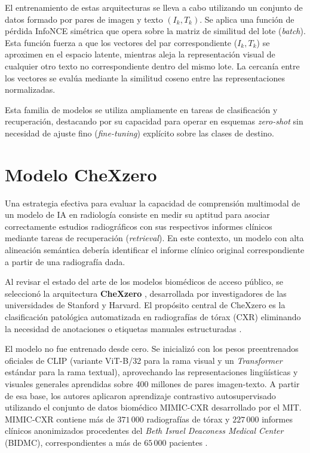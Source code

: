 \documentclass[../tesis.tex]{subfiles}
\begin{document}
El entrenamiento de estas arquitecturas se lleva a cabo utilizando un conjunto de datos formado por pares de imagen y texto $(I_k, T_k)$. Se aplica una función de pérdida InfoNCE simétrica que opera sobre la matriz de similitud del lote (\textit{batch}). Esta función fuerza a que los vectores del par correspondiente ($I_k, T_k$) se aproximen en el espacio latente, mientras aleja la representación visual de cualquier otro texto no correspondiente dentro del mismo lote. La cercanía entre los vectores se evalúa mediante la similitud coseno entre las representaciones normalizadas.

Esta familia de modelos se utiliza ampliamente en tareas de clasificación y recuperación, destacando por su capacidad para operar en esquemas \textit{zero-shot} sin necesidad de ajuste fino (\textit{fine-tuning}) explícito sobre las clases de destino.

\section{Modelo CheXzero}
\label{sec:chexzero}

Una estrategia efectiva para evaluar la capacidad de comprensión multimodal de un modelo de IA en radiología consiste en medir su aptitud para asociar correctamente estudios radiográficos con sus respectivos informes clínicos mediante tareas de recuperación (\textit{retrieval}). En este contexto, un modelo con alta alineación semántica debería identificar el informe clínico original correspondiente a partir de una radiografía dada.

Al revisar el estado del arte de los modelos biomédicos de acceso público, se seleccionó la arquitectura \textbf{CheXzero} \citep{CheXzero_repositorio}, desarrollada por investigadores de las universidades de Stanford y Harvard. El propósito central de CheXzero es la clasificación patológica automatizada en radiografías de tórax (CXR) eliminando la necesidad de anotaciones o etiquetas manuales estructuradas \citep{CheXzero}.

El modelo no fue entrenado desde cero. Se inicializó con los pesos preentrenados oficiales de CLIP (variante ViT-B/32 para la rama visual y un \textit{Transformer} estándar para la rama textual), aprovechando las representaciones lingüísticas y visuales generales aprendidas sobre 400 millones de pares imagen-texto. A partir de esa base, los autores aplicaron aprendizaje contrastivo autosupervisado utilizando el conjunto de datos biomédico MIMIC-CXR desarrollado por el MIT. MIMIC-CXR contiene más de $371\,000$ radiografías de tórax y $227\,000$ informes clínicos anonimizados procedentes del \textit{Beth Israel Deaconess Medical Center} (BIDMC), correspondientes a más de $65\,000$ pacientes \citep{MIMIC-CXR}.
\end{document}
